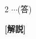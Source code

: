 \documentclass[../../../../main.tex]{subfiles}
\begin{document}
\begin{multicols}{2}
  $\cdots$(答)

  \vspace{10pt}
  {\bf[解説]}

  \newpage
\end{multicols}
\end{document}
